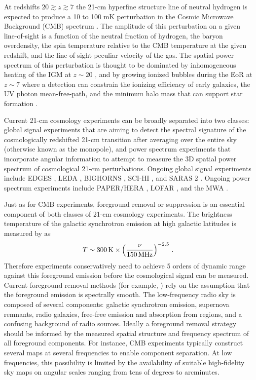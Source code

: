 \documentclass[twocolumn]{aastex61}
\begin{document}
At redshifts $20 \gtrsim z \gtrsim 7$ the 21-cm hyperfine structure line of neutral hydrogen is
expected to produce a 10 to 100 mK perturbation in the Cosmic Microwave Background (CMB) spectrum
\citep{2006PhR...433..181F, 2012RPPh...75h6901P}. The amplitude of this perturbation on a given
line-of-sight is a function of the neutral fraction of hydrogen, the baryon overdensity, the spin
temperature relative to the CMB temperature at the given redshift, and the line-of-sight peculiar
velocity of the gas.  The spatial power spectrum of this perturbation is thought to be dominated by
inhomogeneous heating of the IGM at $z\sim 20$ \citep{2014MNRAS.437L..36F}, and by growing ionized
bubbles during the EoR at $z\sim 7$ where a detection can constrain the ionizing efficiency of early
galaxies, the UV photon mean-free-path, and the minimum halo mass that can support star formation
\citep{2015MNRAS.449.4246G}.

Current 21-cm cosmology experiments can be broadly separated into two classes: global signal
experiments that are aiming to detect the spectral signature of the cosmologically redshifted 21-cm
transition after averaging over the entire sky (otherwise known as the monopole), and power spectrum
experiments that incorporate angular information to attempt to measure the 3D spatial power spectrum
of cosmological 21-cm perturbations.  Ongoing global signal experiments include EDGES
\citep{2010Natur.468..796B, 2017ApJ...847...64M}, LEDA \citep{2017arXiv170909313P}, BIGHORNS
\citep{2015PASA...32....4S}, SCI-HI \citep{2014ApJ...782L...9V}, and SARAS 2
\citep{2017arXiv170306647S}.  Ongoing power spectrum experiments include PAPER/HERA
\citep{2015ApJ...809...61A, 2016arXiv160607473D}, LOFAR \citep{2017ApJ...838...65P}, and the MWA
\citep{2016ApJ...833..102B, 2016MNRAS.460.4320E}.

Just as for CMB experiments, foreground removal or suppression is an essential component of both
classes of 21-cm cosmology experiments. The brightness temperature of the galactic synchrotron
emission at high galactic latitudes is measured by \citet{2008AJ....136..641R} as
\begin{equation}
    T \sim 300\,{\rm K} \times \left(\frac{\nu}{150\,{\rm MHz}}\right)^{-2.5}\,.
\end{equation}
Therefore experiments conservatively need to achieve 5 orders of dynamic range against this
foreground emission before the cosmological signal can be measured. Current foreground removal
methods (for example, \citealt{2012ApJ...756..165P}) rely on the assumption that the foreground
emission is spectrally smooth. The low-frequency radio sky is composed of several components:
galactic synchrotron emission, supernova remnants, radio galaxies, free-free emission and absorption
from  regions, and a confusing background of radio sources.  Ideally a foreground removal
strategy should be informed by the measured spatial structure and frequency spectrum of all
foreground components. For instance, CMB experiments typically construct several maps at several
frequencies to enable component separation.  At low frequencies, this possibility is limited by the
availability of suitable high-fidelity sky maps on angular scales ranging from tens of degrees to
arcminutes.
\end{document}

